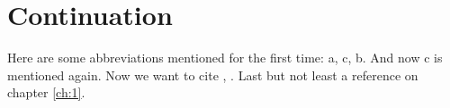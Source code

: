 \chapter{Continuation}

Here are some abbreviations mentioned for the first time: \gls{a}, \gls{c}, \gls{b}. And now \gls{c} is mentioned again. Now we want to cite \cite{Gray1981}, \cite{Cerami2002}. Last but not least a reference on chapter \ref{ch:1}.